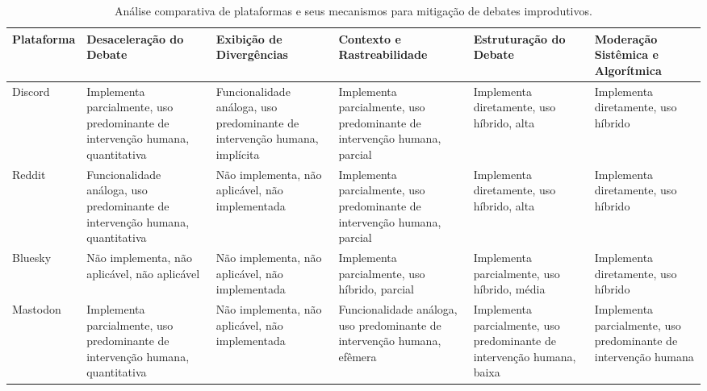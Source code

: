 \documentclass[conference]{IEEEtran} \IEEEoverridecommandlockouts %
\renewcommand{\arraystretch}{1.4}
\begin{document}

\begin{table}[ht]
\centering

\caption{Análise comparativa de plataformas e seus mecanismos para mitigação de debates improdutivos.}
\label{tab:comparacao-plataformas}

\footnotesize
\renewcommand{\arraystretch}{1.4}

\begin{adjustbox}{max width=\textwidth}

\begin{tabularx}{\textwidth}{|
>{\centering\arraybackslash}m{1.8cm}|
Y|Y|Y|Y|Y|
}

\hline

\textbf{Plataforma}
&
\textbf{Desaceleração do Debate}
&
\textbf{Exibição de Divergências}
&
\textbf{Contexto e Rastreabilidade}
&
\textbf{Estruturação do Debate}
&
\textbf{Moderação Sistêmica e Algorítmica}
\\

\hline

Discord
&
Implementa parcialmente, uso predominante de intervenção humana, quantitativa
&
Funcionalidade análoga, uso predominante de intervenção humana, implícita
&
Implementa parcialmente, uso predominante de intervenção humana, parcial
&
Implementa diretamente, uso híbrido, alta
&
Implementa diretamente, uso híbrido
\\

\hline

Reddit
&
Funcionalidade análoga, uso predominante de intervenção humana, quantitativa
&
Não implementa, não aplicável, não implementada
&
Implementa parcialmente, uso predominante de intervenção humana, parcial
&
Implementa diretamente, uso híbrido, alta
&
Implementa diretamente, uso híbrido
\\

\hline

Bluesky
&
Não implementa, não aplicável, não aplicável
&
Não implementa, não aplicável, não implementada
&
Implementa parcialmente, uso híbrido, parcial
&
Implementa parcialmente, uso híbrido, média
&
Implementa diretamente, uso híbrido
\\

\hline

Mastodon
&
Implementa parcialmente, uso predominante de intervenção humana, quantitativa
&
Não implementa, não aplicável, não implementada
&
Funcionalidade análoga, uso predominante de intervenção humana, efêmera
&
Implementa parcialmente, uso predominante de intervenção humana, baixa
&
Implementa parcialmente, uso predominante de intervenção humana
\\


\end{tabularx}
\end{adjustbox}
\end{table}
\end{document}
